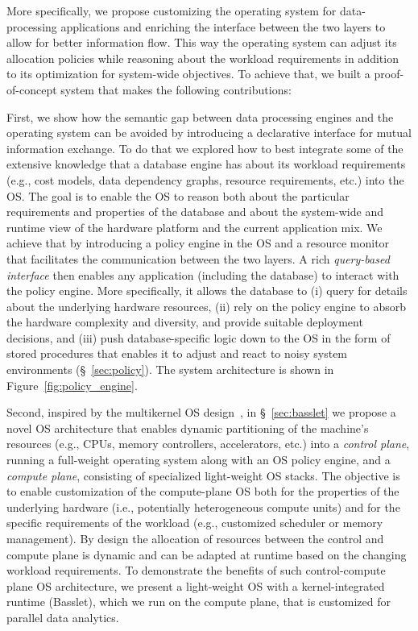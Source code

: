 \documentclass[11pt]{article}
\begin{document}
More specifically, we propose customizing the operating system for data-processing applications
and enriching the interface between the two layers to allow for better information flow.
This way the operating system can adjust its allocation policies while reasoning about 
the workload requirements in addition to its optimization for system-wide objectives.
To achieve that, we built a proof-of-concept system that makes the following contributions:

First, we show how the semantic gap between data processing engines and the 
operating system can be avoided by introducing a declarative interface for mutual information
exchange. To do that we explored how to best integrate some of the extensive knowledge 
that a database engine has about its workload requirements (e.g., cost models, data 
dependency graphs, resource requirements, etc.) into the OS. The goal is to enable 
the OS to reason both about the particular requirements and properties of the database 
and about the system-wide and runtime view of the hardware platform and the current
application mix. We achieve that by introducing a policy engine in the OS and a 
resource monitor that facilitates the communication between the two layers. 
A rich \textit{query-based interface} 
then enables any application (including the database) to interact with the policy 
engine. More specifically, it allows the database to (i) query for details about the 
underlying hardware resources, (ii) rely on the policy engine to absorb the hardware 
complexity and diversity, and provide suitable deployment decisions, and (iii) 
push database-specific logic down to the OS in the form of stored procedures that 
enables it to adjust and react to noisy system environments (\S~\ref{sec:policy}). 
The system architecture is shown in Figure~\ref{fig:policy_engine}. 


Second, inspired by the multikernel OS design~\cite{baumann:sosp09}, in \S~\ref{sec:basslet}
we propose a novel OS architecture that enables dynamic partitioning of the 
machine's resources (e.g., CPUs, memory controllers, accelerators, etc.) into a 
\textit{control plane}, running a full-weight operating system along with an OS 
policy engine, and a \textit{compute plane}, consisting of specialized light-weight 
OS stacks. The objective is to enable customization of the compute-plane OS both 
for the properties of the underlying hardware (i.e., potentially heterogeneous
compute units) and for the specific requirements of the workload (e.g., customized 
scheduler or memory management). By design the allocation of resources between the 
control and compute plane is dynamic and can be adapted at runtime based on the 
changing workload requirements. 
To demonstrate the benefits of such control-compute plane OS architecture, we present 
a light-weight OS with a kernel-integrated runtime (Basslet), which we run on the 
compute plane, that is customized for parallel data analytics. 
\end{document}
